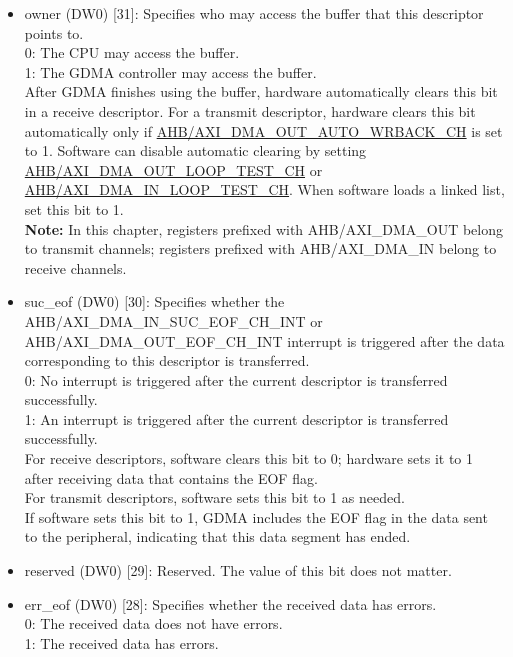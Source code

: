 \documentclass[main\_\_EN.tex]{subfiles}
\begin{document}
\begin{itemize}
    \item owner (DW0) [31]: Specifies who may access the buffer that this descriptor points to.\\
    0: The CPU may access the buffer. \\
    1: The GDMA controller may access the buffer.\\
    After GDMA finishes using the buffer, hardware automatically clears this bit in a receive descriptor. For a transmit descriptor, hardware clears this bit automatically only if \hyperref[fielddesc:AHBDMAOUTAUTOWRBACKCHN]{AHB/AXI\_DMA\_OUT\_AUTO\_WRBACK\_CH} is set to 1. Software can disable automatic clearing by setting \hyperref[fielddesc:AHBDMAOUTLOOPTESTCHN]{AHB/AXI\_DMA\_OUT\_LOOP\_TEST\_CH} or \hyperref[fielddesc:AHBDMAINLOOPTESTCHN]{AHB/AXI\_DMA\_IN\_LOOP\_TEST\_CH}. When software loads a linked list, set this bit to 1.\\
    {\bfseries Note:} In this chapter, registers prefixed with AHB/AXI\_DMA\_OUT belong to transmit channels; registers prefixed with AHB/AXI\_DMA\_IN belong to receive channels.
    \item suc\_eof (DW0) [30]: Specifies whether the AHB/AXI\_DMA\_IN\_SUC\_EOF\_CH\_INT or AHB/AXI\_DMA\_OUT\_EOF\_CH\_INT interrupt is triggered after the data corresponding to this descriptor is transferred.\\
    0: No interrupt is triggered after the current descriptor is transferred successfully.\\
    1: An interrupt is triggered after the current descriptor is transferred successfully.\\
    For receive descriptors, software clears this bit to 0; hardware sets it to 1 after receiving data that contains the EOF flag.\\
    For transmit descriptors, software sets this bit to 1 as needed.\\
    If software sets this bit to 1, GDMA includes the EOF flag in the data sent to the peripheral, indicating that this data segment has ended.
    \item reserved (DW0) [29]: Reserved. The value of this bit does not matter.
    \item err\_eof (DW0) [28]: Specifies whether the received data has errors.\\
    0: The received data does not have errors.\\
    1: The received data has errors.\\

\end{itemize}
\end{document}
